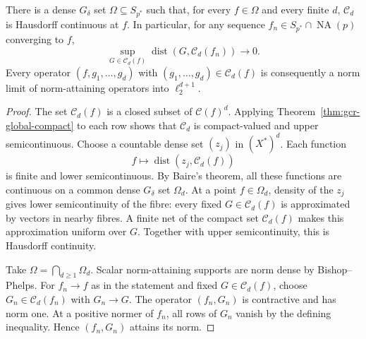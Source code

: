 \documentclass[10pt]{amsart}
\newcommand{\NA}{\operatorname{NA}}
\newcommand{\Cset}{\mathcal C}
\begin{document}
\begin{theorem}
\label{thm:gcr-residual-recovery}
There is a dense $G_\delta$ set $\Omega\subseteq S_{p^*}$
such that, for every $f\in\Omega$ and every finite $d$,
$\Cset_d$ is Hausdorff continuous at $f$.
In particular, for any sequence
$f_n\in S_{p^*}\cap\NA(p)$ converging to $f$,
\[
 \sup_{G\in\Cset_d(f)}
       \operatorname{dist}(G,\Cset_d(f_n))\longrightarrow0.
\]
Every operator $(f,g_1,\ldots,g_d)$ with
$(g_1,\ldots,g_d)\in\Cset_d(f)$ is consequently a norm
limit of norm-attaining operators into $\ell_2^{d+1}$.
\end{theorem}
\begin{proof}
The set $\Cset_d(f)$ is a closed subset of $\Cset(f)^d$.
Applying Theorem~\ref{thm:gcr-global-compact} to each row shows
that $\Cset_d$ is compact-valued and upper semicontinuous.
Choose a countable dense set $(z_j)$ in $(X^*)^d$.
Each function
\[
 f\longmapsto\operatorname{dist}(z_j,\Cset_d(f))
\]
is finite and lower semicontinuous. By Baire's theorem, all
these functions are continuous on a common dense $G_\delta$
set $\Omega_d$. At a point $f\in\Omega_d$, density of the
$z_j$ gives lower semicontinuity of the fibre: every fixed
$G\in\Cset_d(f)$ is approximated by vectors in nearby fibres.
A finite net of the compact set $\Cset_d(f)$ makes this
approximation uniform over $G$. Together with upper
semicontinuity, this is Hausdorff continuity.

Take $\Omega=\bigcap_{d\ge1}\Omega_d$. Scalar norm-attaining
supports are norm dense by Bishop--Phelps. For $f_n\to f$ as
in the statement and fixed $G\in\Cset_d(f)$, choose
$G_n\in\Cset_d(f_n)$ with $G_n\to G$.
The operator $(f_n,G_n)$ is contractive and has norm one.
At a positive normer of $f_n$, all rows of $G_n$ vanish by
the defining inequality. Hence $(f_n,G_n)$ attains its norm.
\end{proof}
\end{document}
